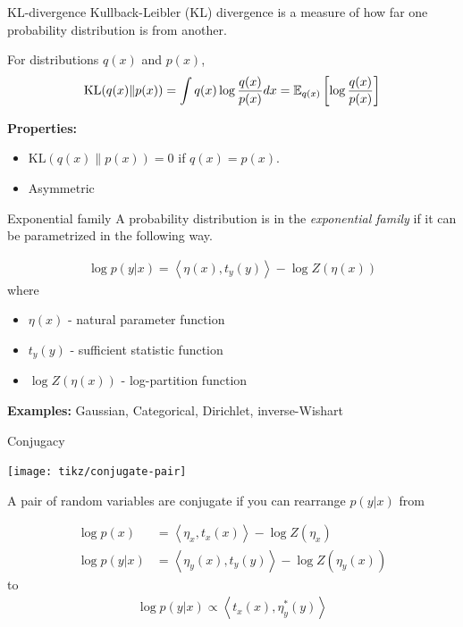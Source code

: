 \documentclass[10pt, compress]{beamer}
\begin{document}
\begin{frame}{KL-divergence}
  Kullback-Leibler (KL) divergence
  is a measure of how far one probability distribution
  is from another.

  \pause
  For distributions $q(x)$ and $p(x)$,
  \begin{align*}
    \textrm{KL}(q(x)\|p(x)) = \int q(x)\log \frac{q(x)}{p(x)}dx = \mathbb{E}_{q(x)}\left[\log\frac{q(x)}{p(x)}\right]
  \end{align*}

  \pause
  \textbf{Properties:}
  \begin{itemize}
    \item $\textrm{KL}(q(x)\|p(x)) = 0$ if $q(x) = p(x)$.
    \item Asymmetric
  \end{itemize}
\end{frame}

\begin{frame}{Exponential family}
  A probability distribution is in the \emph{exponential family}
  if it can be parametrized in the following way.

  \pause

  \begin{align*}
    \log p(y | x) = \left\langle\eta(x), t_y(y)\right\rangle - \log Z(\eta(x))
  \end{align*}
  where
  \begin{itemize}
      \pause
    \item $\eta(x)$ - natural parameter function
      \pause
    \item $t_y(y)$ - sufficient statistic function
      \pause
    \item $\log Z(\eta(x))$ - log-partition function
  \end{itemize}
  \pause
  \textbf{Examples:} Gaussian, Categorical, Dirichlet, inverse-Wishart
\end{frame}

\begin{frame}{Conjugacy}
   \begin{center}
        \texttt{[image: tikz/conjugate-pair]}
   \end{center}
   A pair of random variables are conjugate if
   you can rearrange $p(y | x)$ from

  \pause

  \begin{align*}
    \log p(x) &= \left\langle\eta_x, t_x(x)\right\rangle - \log Z(\eta_x) \\
    \log p(y | x) &= \left\langle\eta_y(x), t_y(y)\right\rangle - \log Z(\eta_y(x))
  \end{align*}
  to
  \pause
  \begin{align*}
    \log p(y | x) \propto \left\langle t_x(x), \eta^*_y(y)\right\rangle
  \end{align*}
\end{frame}
\end{document}
